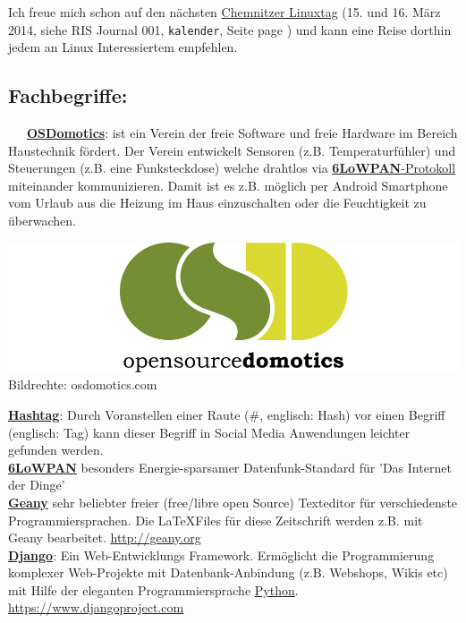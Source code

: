 \documentclass[10pt,a4paper,ngerman,twoside]{article} %
\begin{document}
\begin{multicols}{3}
Ich freue mich schon auf den nächsten \href{http://chemnitzer.linux-tage.de/2014/en/info/}{Chemnitzer Linuxtag} (15. und 16. März 2014, siehe RIS Journal 001, \texttt{kalender}, Seite page \pageref{kalender}) und kann eine Reise dorthin jedem an Linux Interessiertem empfehlen.

\subsection*{Fachbegriffe:}
~~~\href{http://www.osdomotics.com/}{\textbf{OSDomotics}}: ist ein Verein der freie Software und freie Hardware im Bereich Haustechnik fördert. Der Verein entwickelt Sensoren (z.B. Temperaturfühler) und Steuerungen (z.B. eine Funksteckdose) welche drahtlos via \href{http://de.wikipedia.org/wiki/6LoWPAN}{\textbf{6LoWPAN}-Protokoll} miteinander kommunizieren. Damit ist es z.B. möglich per Android Smartphone vom Urlaub aus die Heizung im Haus einzuschalten oder die Feuchtigkeit zu überwachen.
\begin{center}
\includegraphics[width=\linewidth]{chemnitz/chemnitz_osd_domotics_logo-2881.png}
\footnotesize{Bildrechte: osdomotics.com}
\end{center}

\href{http://de.wikipedia.org/wiki/Hashtag}{\textbf{Hashtag}}: Durch Voranstellen einer Raute (\#, englisch: Hash) vor einen Begriff (englisch: Tag) kann dieser Begriff in Social Media Anwendungen leichter gefunden werden. \\

\href{http://de.wikipedia.org/wiki/6LoWPAN}{\textbf{6LoWPAN}} besonders Energie-sparsamer  Datenfunk-Standard für 'Das Internet der Dinge'\\

\href{http://geany.org/}{\textbf{Geany}} sehr beliebter freier (free/libre open Source) Texteditor für verschiedenste Programmiersprachen. Die \LaTeX Files für diese Zeitschrift werden z.B. mit Geany bearbeitet. \url{http://geany.org} \\

\href{https://www.djangoproject.com/}{\textbf{Django}}: Ein Web-Entwicklungs Framework. Ermöglicht die Programmierung komplexer Web-Projekte mit Datenbank-Anbindung (z.B. Webshops, Wikis etc) mit Hilfe der eleganten Programmiersprache \href{http://python.org}{Python}. \url{https://www.djangoproject.com} \\


\end{multicols}
\end{document}
